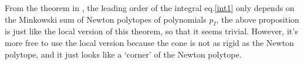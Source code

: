 \documentclass[12pt]{article}
\theoremstyle{definition}
\theoremstyle{plain}
\begin{document}
From the theorem in \cite{Arkani-Hamed:2019mrd}, the leading order of the integral eq.\eqref{int1} 
only depends on the Minkowski sum of Newton polytopes of polynomials $p_I$, 
the above proposition is just like the local version of this theorem, so that 
it seems trivial. However, it's more free to use the local version because 
the cone is not as rigid as the Newton polytope, and it just looks  
like a `corner' of the Newton polytope.

\end{document}
